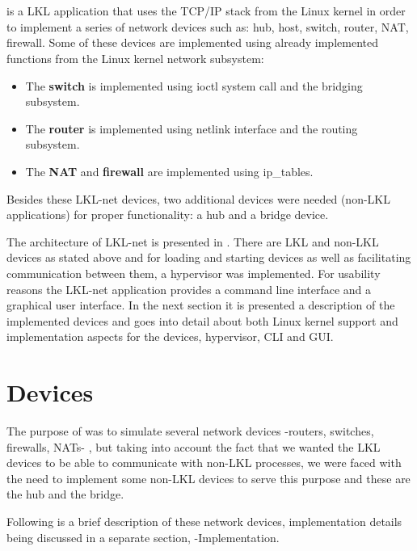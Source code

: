 \section{\project}
\label{sec:lkl-net}
\textbf{\project} is a LKL application that uses the  TCP/IP stack from the Linux kernel in order to implement a series of network devices such as: hub, host, switch, router, NAT, firewall. Some of these devices are implemented using already implemented functions from the Linux kernel network subsystem: 
\begin{itemize}
\item The \textbf{switch} is implemented using ioctl system call and the bridging subsystem. 
\item The \textbf{router} is implemented using netlink interface and the routing subsystem.
\item The \textbf{NAT} and \textbf{firewall} are implemented using ip_tables. 
\end{itemize} 
Besides these LKL-net devices, two additional devices were needed (non-LKL applications) for proper functionality: a hub and a bridge device.

The architecture of LKL-net is presented in .
There are LKL and non-LKL devices as stated above and for loading and starting devices as well as 
facilitating communication between them, a hypervisor was implemented. For usability reasons the LKL-net 
application provides a command line interface and a graphical user interface.
In the next section it is presented a description of the implemented devices and  
goes into detail about both Linux kernel support and implementation aspects for the devices, hypervisor, CLI and GUI. 
\section{Devices}
\label{sec:devices}
The purpose of \project was to simulate several network devices -routers, switches, firewalls, NATs- , but taking into account the fact that we wanted the LKL devices to be able to communicate with non-LKL processes, we were faced with the need to implement some non-LKL devices to serve this purpose and these are the hub and the bridge.

Following is a brief description of these network devices, implementation details being discussed in a separate section,  -Implementation.
